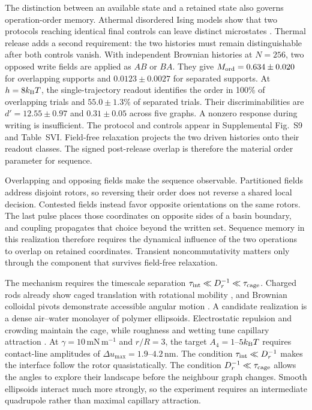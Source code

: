 \documentclass[aps,prl,reprint,superscriptaddress,nofootinbib,floatfix]{revtex4-2}
\begin{document}
The distinction between an available state and a retained state also governs
operation-order memory. Athermal disordered Ising models show that two
protocols reaching identical final controls can leave distinct microstates
\cite{croce2026}. Thermal release adds a second requirement: the two histories
must remain distinguishable after both controls vanish. With independent
Brownian histories at \(N=256\), two opposed write fields are applied as
\(AB\) or \(BA\). They give \(M_{\rm ord}=0.634\pm0.020\) for overlapping
supports and \(0.0123\pm0.0027\) for separated supports. At
\(h=8k_{\rm B}T\), the single-trajectory readout identifies the order in
100\% of overlapping trials and \(55.0\pm1.3\%\) of separated trials. Their discriminabilities are
\(d'=12.55\pm0.97\) and \(0.31\pm0.05\) across five graphs. A nonzero response
during writing is insufficient. The protocol and controls appear in
Supplemental Fig.~S9 and Table~SVI. Field-free relaxation projects the two
driven histories onto their readout classes. The signed post-release overlap
is therefore the material order parameter for sequence.

Overlapping and opposing fields make the sequence observable. Partitioned
fields address disjoint rotors, so reversing their order does not reverse a
shared local decision. Contested fields instead favor opposite orientations
on the same rotors. The last pulse places those coordinates on opposite sides
of a basin boundary, and coupling propagates that choice beyond the written
set. Sequence memory in this realization therefore requires the dynamical
influence of the two operations to overlap on retained coordinates. Transient
noncommutativity matters only through the component that survives field-free
relaxation.

The mechanism requires the timescale separation
\(\tau_{\rm int}\ll D_r^{-1}\ll\tau_{\rm cage}\). Charged rods already show
caged translation with rotational mobility \cite{besseling2026}, and Brownian
colloidal pivots demonstrate accessible angular motion \cite{melio2026}. A
candidate realization is a dense air--water monolayer of polymer ellipsoids.
Electrostatic repulsion and crowding maintain the cage, while roughness and
wetting tune capillary attraction \cite{trevenen2023,rahman2026}. At
\(\gamma=10\,\mathrm{mN\,m^{-1}}\) and \(r/R=3\), the target
\(A_4=1\)--\(5k_{\rm B}T\) requires contact-line amplitudes of
\(\Delta u_{\max}=1.9\)--\(4.2\,\mathrm{nm}\).
The condition \(\tau_{\rm int}\ll D_r^{-1}\) makes the interface follow the
rotor quasistatically. The condition \(D_r^{-1}\ll\tau_{\rm cage}\) allows
the angles to explore their landscape before the
neighbour graph changes. Smooth ellipsoids interact much more strongly, so
the experiment requires an intermediate quadrupole rather than maximal
capillary attraction.
\end{document}
